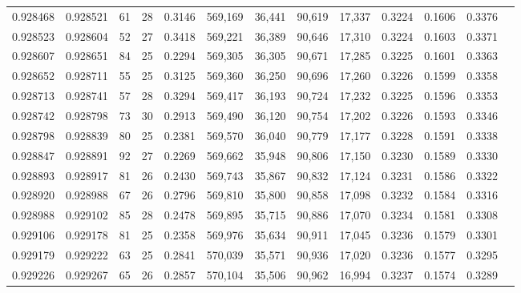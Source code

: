 \begin{tabular}{rrrrrrrrrrrrr}
0.928468 & 0.928521 &    61 &  28 &                                     0.3146 & 569,169 &  36,441 &  90,619 &  17,337 & 0.3224 & 0.1606 & 0.3376 \\
0.928523 & 0.928604 &    52 &  27 &                                     0.3418 & 569,221 &  36,389 &  90,646 &  17,310 & 0.3224 & 0.1603 & 0.3371 \\
0.928607 & 0.928651 &    84 &  25 &                                     0.2294 & 569,305 &  36,305 &  90,671 &  17,285 & 0.3225 & 0.1601 & 0.3363 \\
0.928652 & 0.928711 &    55 &  25 &                                     0.3125 & 569,360 &  36,250 &  90,696 &  17,260 & 0.3226 & 0.1599 & 0.3358 \\
0.928713 & 0.928741 &    57 &  28 &                                     0.3294 & 569,417 &  36,193 &  90,724 &  17,232 & 0.3225 & 0.1596 & 0.3353 \\
0.928742 & 0.928798 &    73 &  30 &                                     0.2913 & 569,490 &  36,120 &  90,754 &  17,202 & 0.3226 & 0.1593 & 0.3346 \\
0.928798 & 0.928839 &    80 &  25 &                                     0.2381 & 569,570 &  36,040 &  90,779 &  17,177 & 0.3228 & 0.1591 & 0.3338 \\
0.928847 & 0.928891 &    92 &  27 &                                     0.2269 & 569,662 &  35,948 &  90,806 &  17,150 & 0.3230 & 0.1589 & 0.3330 \\
0.928893 & 0.928917 &    81 &  26 &                                     0.2430 & 569,743 &  35,867 &  90,832 &  17,124 & 0.3231 & 0.1586 & 0.3322 \\
0.928920 & 0.928988 &    67 &  26 &                                     0.2796 & 569,810 &  35,800 &  90,858 &  17,098 & 0.3232 & 0.1584 & 0.3316 \\
0.928988 & 0.929102 &    85 &  28 &                                     0.2478 & 569,895 &  35,715 &  90,886 &  17,070 & 0.3234 & 0.1581 & 0.3308 \\
0.929106 & 0.929178 &    81 &  25 &                                     0.2358 & 569,976 &  35,634 &  90,911 &  17,045 & 0.3236 & 0.1579 & 0.3301 \\
0.929179 & 0.929222 &    63 &  25 &                                     0.2841 & 570,039 &  35,571 &  90,936 &  17,020 & 0.3236 & 0.1577 & 0.3295 \\
0.929226 & 0.929267 &    65 &  26 &                                     0.2857 & 570,104 &  35,506 &  90,962 &  16,994 & 0.3237 & 0.1574 & 0.3289 \\

\end{tabular}
